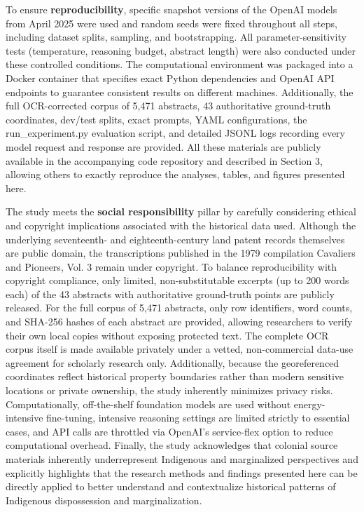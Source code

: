 To ensure \textbf{reproducibility}, specific snapshot versions of the
OpenAI models from April 2025 were used and random seeds were fixed
throughout all steps, including dataset splits, sampling, and
bootstrapping. All parameter-sensitivity tests (temperature, reasoning
budget, abstract length) were also conducted under these controlled
conditions. The computational environment was packaged into a Docker
container that specifies exact Python dependencies and OpenAI API
endpoints to guarantee consistent results on different machines.
Additionally, the full OCR-corrected corpus of 5,471 abstracts, 43
authoritative ground-truth coordinates, dev/test splits, exact prompts,
YAML configurations, the run\_experiment.py evaluation script, and
detailed JSONL logs recording every model request and response are
provided. All these materials are publicly available in the accompanying
code repository and described in Section 3, allowing others to exactly
reproduce the analyses, tables, and figures presented here.

The study meets the \textbf{social responsibility} pillar by carefully
considering ethical and copyright implications associated with the
historical data used. Although the underlying seventeenth- and
eighteenth-century land patent records themselves are public domain, the
transcriptions published in the 1979 compilation Cavaliers and Pioneers,
Vol. 3 remain under copyright. To balance reproducibility with copyright
compliance, only limited, non-substitutable excerpts (up to 200 words
each) of the 43 abstracts with authoritative ground-truth points are
publicly released. For the full corpus of 5,471 abstracts, only row
identifiers, word counts, and SHA-256 hashes of each abstract are
provided, allowing researchers to verify their own local copies without
exposing protected text. The complete OCR corpus itself is made
available privately under a vetted, non-commercial data-use agreement
for scholarly research only. Additionally, because the georeferenced
coordinates reflect historical property boundaries rather than modern
sensitive locations or private ownership, the study inherently minimizes
privacy risks. Computationally, off-the-shelf foundation models are used
without energy-intensive fine-tuning, intensive reasoning settings are
limited strictly to essential cases, and API calls are throttled via
OpenAI's service-flex option to reduce computational overhead. Finally,
the study acknowledges that colonial source materials inherently
underrepresent Indigenous and marginalized perspectives and explicitly
highlights that the research methods and findings presented here can be
directly applied to better understand and contextualize historical
patterns of Indigenous dispossession and marginalization.


